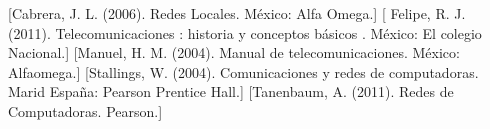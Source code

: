 \documentclass[10pt]{article}
\begin{document}
\newpage
\clearpage
\begin{thebibliography}{0}
	\bibitem{}[Cabrera, J. L. (2006). Redes Locales. México: Alfa Omega.]
	\bibitem{}[ Felipe, R. J. (2011). Telecomunicaciones : historia y conceptos básicos . México: El colegio Nacional.]
		\bibitem{}[Manuel, H. M. (2004). Manual de telecomunicaciones. México: Alfaomega.]
		\bibitem{}[Stallings, W. (2004). Comunicaciones y redes de computadoras. Marid España: Pearson Prentice Hall.]
		\bibitem{}[Tanenbaum, A. (2011). Redes de Computadoras. Pearson.]
	
\end{thebibliography}
\end{document}
